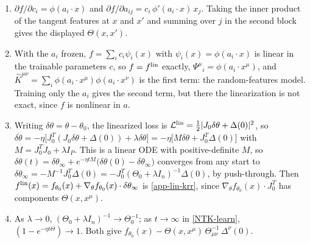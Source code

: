 \documentclass[11pt]{article}
\newcommand{\CL}{{\mathcal L}}
\newcommand{\pd}{\partial}
\begin{document}
\begin{solution}
\begin{enumerate}
    \item $\pd f/\pd c_i = \phi(a_i\cdot x)$ and $\pd f/\pd a_{ij} = c_i\,\phi'(a_i\cdot x)\,x_j$. Taking the inner product of the tangent features at $x$ and $x'$ and summing over $j$ in the second block gives the displayed $\Theta(x,x')$.
    \item With the $a_i$ frozen, $f = \sum_i c_i\psi_i(x)$ with $\psi_i(x) = \phi(a_i\cdot x)$ is linear in the trainable parameters $c$, so $f = f^{\rm lin}$ exactly, $\Psi^\mu{}_i = \phi(a_i\cdot x^\mu)$, and $\hat K^{\mu\nu} = \sum_i\phi(a_i\cdot x^\mu)\phi(a_i\cdot x^\nu)$ is the first term: the random-features model. Training only the $a_i$ gives the second term, but there the linearization is not exact, since $f$ is nonlinear in $a$.
    \item Writing $\delta\theta = \theta-\theta_0$, the linearized loss is $\CL^{\rm lin} = \frac{1}{2}|J_0\delta\theta+\Delta(0)|^2$, so
    $\delta\dot\theta = -\eta\big[J_0^T(J_0\delta\theta+\Delta(0))+\lambda\delta\theta\big] = -\eta\big[M\delta\theta+J_0^T\Delta(0)\big]$ with $M = J_0^TJ_0+\lambda I_P$.
    This is a linear ODE with positive-definite $M$, so $\delta\theta(t) = \delta\theta_\infty+e^{-\eta tM}\big(\delta\theta(0)-\delta\theta_\infty\big)$ converges from any start to $\delta\theta_\infty = -M^{-1}J_0^T\Delta(0) = -J_0^T(\Theta_0+\lambda I_n)^{-1}\Delta(0)$, by push-through. Then $f^{\rm lin}(x) = f_{\theta_0}(x)+\nabla_\theta f_{\theta_0}(x)\cdot\delta\theta_\infty$ is \eqref{app-lin-krr}, since $\nabla_\theta f_{\theta_0}(x)\cdot J_0^T$ has components $\Theta(x,x^\mu)$.
    \item As $\lambda\to0$, $(\Theta_0+\lambda I_n)^{-1}\to\Theta_0^{-1}$; as $t\to\infty$ in \eqref{NTK-learn}, $(1-e^{-\eta t\Theta})\to 1$. Both give $f_{\theta_0}(x)-\Theta(x,x^\mu)\,\Theta^{-1}_{\mu\nu}\,\Delta^\nu(0)$.
\end{enumerate}
\end{solution}



\end{document}
